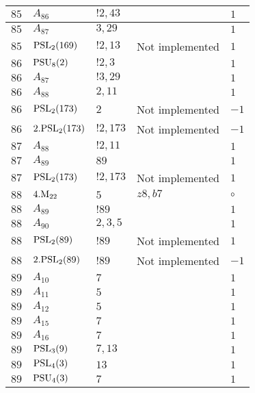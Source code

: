 \documentclass[a4paper, 11pt]{article}
\begin{document}
\begin{longtable}{lllll}
        $ 85 $ & $ A_{86} $ & $ !2, 43 $ & $ ~ $ & $ 1$ \\ \hline
        $ 85 $ & $ A_{87} $ & $ 3, 29 $ & $ ~ $ & $ 1$ \\ \hline
        $ 85 $ & $ {\rm PSL}_{2}(169) $ & $ !2, 13 $ &  Not implemented & $ 1$ \\ \hline
        $ 86 $ & $ {\rm PSU}_{8}(2) $ & $ ! 2,3 $ & $ ~ $ & $ 1$ \\ \hline
        $ 86 $ & $ A_{87} $ & $ !3, 29 $ & $ ~ $ & $ 1$ \\ \hline
        $ 86 $ & $ A_{88} $ & $ 2, 11 $ & $ ~ $ & $ 1$ \\ \hline
        $ 86 $ & $ {\rm PSL}_{2}(173) $ & $ 2 $ &  Not implemented & $ -1$ \\ \hline
        $ 86 $ & $ 2.{\rm PSL}_{2}(173) $ & $ !2, 173 $ &  Not implemented & $ -1$ \\ \hline
        $ 87 $ & $ A_{88} $ & $ !2, 11 $ & $ ~ $ & $ 1$ \\ \hline
        $ 87 $ & $ A_{89} $ & $ 89 $ & $ ~ $ & $ 1$ \\ \hline
        $ 87 $ & $ {\rm PSL}_{2}(173) $ & $ !2, 173 $ &  Not implemented & $ 1$ \\ \hline
        $ 88 $ & $ 4.{\rm M}_{22} $ & $ 5 $ & $ z8, b7 $ &  $\circ$ \\ \hline
        $ 88 $ & $ A_{89} $ & $ !89 $ & $ ~ $ & $ 1$ \\ \hline
        $ 88 $ & $ A_{90} $ & $ 2, 3, 5 $ & $ ~ $ & $ 1$ \\ \hline
        $ 88 $ & $ {\rm PSL}_{2}(89) $ & $ !89 $ &  Not implemented & $ 1$ \\ \hline
        $ 88 $ & $ 2.{\rm PSL}_{2}(89) $ & $ !89 $ &  Not implemented & $ -1$ \\ \hline
        $ 89 $ & $ A_{10} $ & $ 7 $ & $ ~ $ & $ 1$ \\ \hline
        $ 89 $ & $ A_{11} $ & $ 5 $ & $ ~ $ & $ 1$ \\ \hline
        $ 89 $ & $ A_{12} $ & $ 5 $ & $ ~ $ & $ 1$ \\ \hline
        $ 89 $ & $ A_{15} $ & $ 7 $ & $ ~ $ & $ 1$ \\ \hline
        $ 89 $ & $ A_{16} $ & $ 7 $ & $ ~ $ & $ 1$ \\ \hline
        $ 89 $ & $ {\rm PSL}_{3}(9) $ & $ 7,13 $ & $ ~ $ & $ 1$ \\ \hline
        $ 89 $ & $ {\rm PSL}_{4}(3) $ & $ 13 $ & $ ~ $ & $ 1$ \\ \hline
        $ 89 $ & $ {\rm PSU}_{4}(3) $ & $ 7 $ & $ ~ $ & $ 1$ \\ \hline

\end{longtable}
\end{document}
